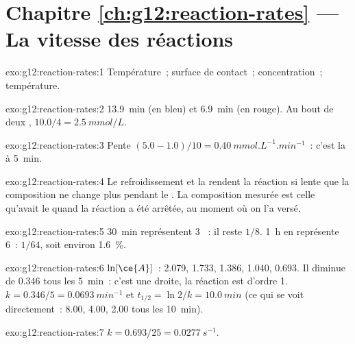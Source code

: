 \section*{Chapitre \ref{ch:g12:reaction-rates} --- La vitesse des réactions}

\begin{solution}{exo:g12:reaction-rates:1}
Température~; surface de contact~; concentration~; température.
\end{solution}

\begin{solution}{exo:g12:reaction-rates:2}
\qty{13.9}{min} (en bleu) et \qty{6.9}{min} (en rouge). Au bout de deux
,
$10.0 / 4 = \qty{2.5}{mmol/L}$.
\end{solution}

\begin{solution}{exo:g12:reaction-rates:3}
Pente $(5.0 - 1.0)/10 = \qty{0.40}{mmol.L^{-1}.min^{-1}}$~: c'est la
 à \qty{5}{min}.
\end{solution}

\begin{solution}{exo:g12:reaction-rates:4}
Le refroidissement et la  rendent la réaction si lente que la
composition ne change plus pendant le . La composition mesurée
est celle qu'avait le  quand la réaction a été arrêtée, au moment
où on l'a versé.
\end{solution}

\begin{solution}{exo:g12:reaction-rates:5}
\qty{30}{min} représentent 3 ~: il reste $1/8$.
\qty{1}{h} en représente 6~:
$1/64$, soit environ \qty{1.6}{\percent}.
\end{solution}

\begin{solution}{exo:g12:reaction-rates:6}
$\ln[\ce{A}]$~: 2.079, 1.733, 1.386, 1.040, 0.693. Il diminue de 0.346
tous les
\qty{5}{min}~: c'est une droite, la réaction est d'ordre 1. $k = 0.346/5 =
\qty{0.0693}{min^{-1}}$ et $t_{1/2} = \ln 2 / k = \qty{10.0}{min}$ (ce
qui se voit directement~: 8.00, 4.00, 2.00 tous les \qty{10}{min}).
\end{solution}

\begin{solution}{exo:g12:reaction-rates:7}
$k = 0.693 / 25 = \qty{0.0277}{s^{-1}}$.
\end{solution}

